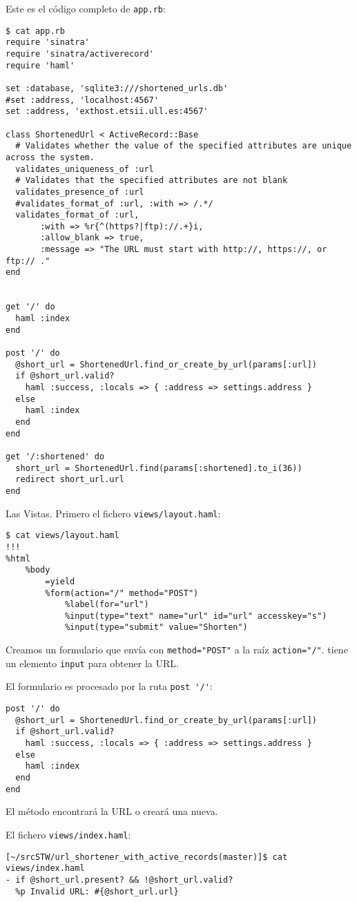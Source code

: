 Este es el código completo de \verb|app.rb|:
\begin{verbatim}
$ cat app.rb 
require 'sinatra'
require 'sinatra/activerecord'
require 'haml'

set :database, 'sqlite3:///shortened_urls.db'
#set :address, 'localhost:4567'
set :address, 'exthost.etsii.ull.es:4567'

class ShortenedUrl < ActiveRecord::Base
  # Validates whether the value of the specified attributes are unique across the system.
  validates_uniqueness_of :url
  # Validates that the specified attributes are not blank
  validates_presence_of :url
  #validates_format_of :url, :with => /.*/
  validates_format_of :url, 
       :with => %r{^(https?|ftp)://.+}i, 
       :allow_blank => true, 
       :message => "The URL must start with http://, https://, or ftp:// ."
end


get '/' do
  haml :index
end

post '/' do
  @short_url = ShortenedUrl.find_or_create_by_url(params[:url])
  if @short_url.valid?
    haml :success, :locals => { :address => settings.address }
  else
    haml :index
  end
end

get '/:shortened' do
  short_url = ShortenedUrl.find(params[:shortened].to_i(36))
  redirect short_url.url
end

\end{verbatim}

Las Vistas. Primero 
el fichero \verb|views/layout.haml|:
\begin{verbatim}
$ cat views/layout.haml 
!!!
%html
    %body
        =yield
        %form(action="/" method="POST")
            %label(for="url")
            %input(type="text" name="url" id="url" accesskey="s")
            %input(type="submit" value="Shorten")
\end{verbatim}
Creamos un formulario que envía con \verb|method="POST"| a la raíz \verb|action="/"|.
tiene un elemento \verb|input| para obtener la URL.

El formulario es procesado por la ruta \verb|post '/'|:
\begin{verbatim}
post '/' do
  @short_url = ShortenedUrl.find_or_create_by_url(params[:url])
  if @short_url.valid?
    haml :success, :locals => { :address => settings.address }
  else
    haml :index
  end
end
\end{verbatim}
El método 
encontrará la URL o creará una nueva.


El fichero \verb|views/index.haml|:
\begin{verbatim}
[~/srcSTW/url_shortener_with_active_records(master)]$ cat views/index.haml 
- if @short_url.present? && !@short_url.valid?
  %p Invalid URL: #{@short_url.url}
\end{verbatim}

